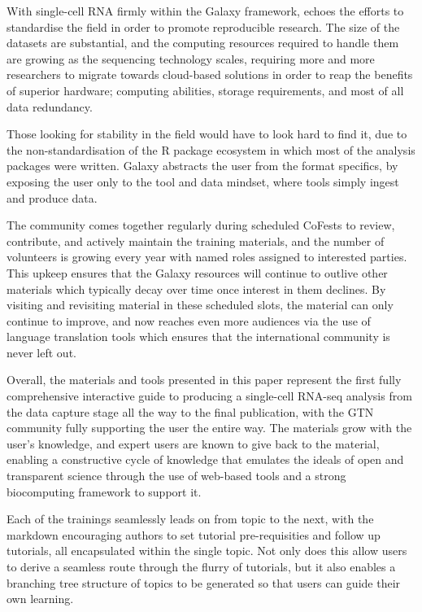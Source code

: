\documentclass[a4paper,num-refs]{oup-contemporary}
\begin{document}
With single-cell RNA firmly within the Galaxy framework, echoes the efforts to standardise the field in order to promote reproducible research. The size of the datasets are substantial, and the computing resources required to handle them are growing as the sequencing technology scales, requiring more and more researchers to migrate towards cloud-based solutions in order to reap the benefits of superior hardware; computing abilities, storage requirements, and most of all data redundancy.

Those looking for stability in the field would have to look hard to find it, due to the non-standardisation of the R package ecosystem in which most of the analysis packages were written. Galaxy abstracts the user from the format specifics, by exposing the user only to the tool and data mindset, where tools simply ingest and produce data.

The community comes together regularly during scheduled CoFests to review, contribute, and actively maintain the training materials, and the number of volunteers is growing every year with named roles assigned to interested parties. This upkeep ensures that the Galaxy resources will continue to outlive other materials which typically decay over time once interest in them declines. By visiting and revisiting material in these scheduled slots, the material can only continue to improve, and now reaches even more audiences via the use of language translation tools which ensures that the international community is never left out.

Overall, the materials and tools presented in this paper represent the first fully comprehensive interactive guide to producing a single-cell RNA-seq analysis from the data capture stage all the way to the final publication, with the GTN community fully supporting the user the entire way. The materials grow with the user's knowledge, and expert users are known to give back to the material, enabling a constructive cycle of knowledge that emulates the ideals of open and transparent science through the use of web-based tools and a strong biocomputing framework to support it.

Each of the trainings seamlessly leads on from topic to the next, with the markdown encouraging authors to set tutorial pre-requisities and follow up tutorials, all encapsulated within the single topic. Not only does this allow users to derive a seamless route through the flurry of tutorials, but it also enables a branching tree structure of topics to be generated so that users can guide their own learning.
\end{document}
